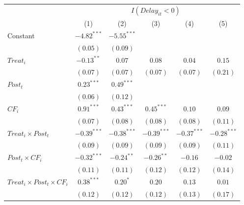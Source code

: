 \documentclass[
]{article}
\begin{document}
\begin{table}
\begin{center}
\begin{tabular}{l c c c c c}
\hline
 & \multicolumn{5}{c}{$I(Delay_{it}<0)$} \\
\cline{2-6}
 & (1) & (2) & (3) & (4) & (5) \\
\hline
Constant                                   & $-4.82^{***}$ & $-5.55^{***}$ &               &               &               \\
                                           & $(0.05)$      & $(0.09)$      &               &               &               \\
$Treat_i$                                  & $-0.13^{**}$  & $0.07$        & $0.08$        & $0.04$        & $0.15$        \\
                                           & $(0.07)$      & $(0.07)$      & $(0.07)$      & $(0.07)$      & $(0.21)$      \\
$Post_t$                                   & $0.23^{***}$  & $0.49^{***}$  &               &               &               \\
                                           & $(0.06)$      & $(0.12)$      &               &               &               \\
$CF_i$                                     & $0.91^{***}$  & $0.43^{***}$  & $0.45^{***}$  & $0.10$        & $0.09$        \\
                                           & $(0.07)$      & $(0.08)$      & $(0.08)$      & $(0.08)$      & $(0.11)$      \\
$Treat_i \times Post_t$                    & $-0.39^{***}$ & $-0.38^{***}$ & $-0.39^{***}$ & $-0.37^{***}$ & $-0.28^{***}$ \\
                                           & $(0.09)$      & $(0.09)$      & $(0.09)$      & $(0.09)$      & $(0.11)$      \\
$Post_t \times CF_i$                       & $-0.32^{***}$ & $-0.24^{**}$  & $-0.26^{**}$  & $-0.16$       & $-0.02$       \\
                                           & $(0.11)$      & $(0.11)$      & $(0.12)$      & $(0.12)$      & $(0.14)$      \\
$Treat_i \times Post_t \times CF_i$        & $0.38^{***}$  & $0.20^{*}$    & $0.20$        & $0.13$        & $0.01$        \\
                                           & $(0.12)$      & $(0.12)$      & $(0.12)$      & $(0.13)$      & $(0.17)$      \\

\end{tabular}
\end{center}
\end{table}
\end{document}
